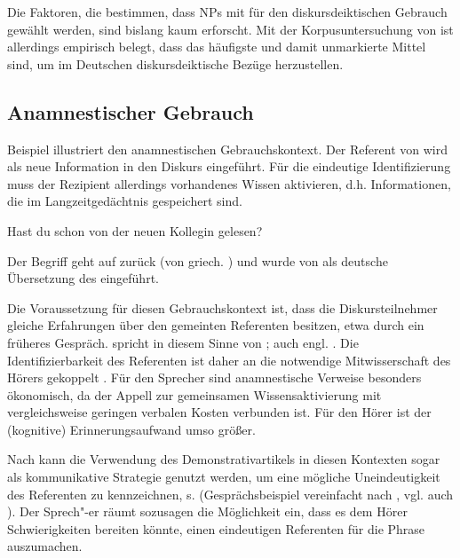 Die Faktoren, die bestimmen, dass NPs  mit  für den diskursdeiktischen  Gebrauch gewählt werden, sind bislang kaum erforscht. Mit der Korpusuntersuchung  von \textcite{Consten2007} ist allerdings empirisch belegt, dass  das häufigste und damit unmarkierte Mittel sind, um im Deutschen diskursdeiktische  Bezüge herzustellen.

\subsection{Anamnestischer Gebrauch}\label{sec:amnamnestisch}

Beispiel  illustriert den anamnestischen  Gebrauchskontext. Der Referent von   wird als neue Information  in den Diskurs eingeführt. Für die eindeutige Identifizierung muss der Rezipient allerdings vorhandenes Wissen aktivieren, d.h. Informationen, die im Langzeitgedächtnis gespeichert sind.

\begin{exe}
	\ex \label{ex:anamn} Hast du schon  von der neuen Kollegin gelesen?  
\end{exe}

Der Begriff   geht auf \textcite{Buhler1934} zurück (von griech.  ) und wurde von \textcite{Himmelmann1997} als deutsche Übersetzung des  \parencite{Himmelmann1996,Diessel1999}  eingeführt.

Die Voraussetzung für diesen Gebrauchskontext ist, dass die Diskursteilnehmer gleiche Erfahrungen über den gemeinten Referenten besitzen, etwa durch ein früheres Gespräch. \textcite[44]{Bisle-Muller1991} spricht in diesem Sinne von ; auch engl.  \parencite[106]{Diessel1999}. Die Identifizierbarkeit des Referenten ist daher an die notwendige Mitwisserschaft des Hörers gekoppelt \parencite[72]{Szczepaniak2011a}. Für den Sprecher sind anamnestische  Verweise besonders ökonomisch, da der Appell zur gemeinsamen Wissensaktivierung mit vergleichsweise geringen verbalen Kosten verbunden ist. Für den Hörer ist der (kognitive) Erinnerungsaufwand umso größer.

Nach \textcite[79--80]{Bisle-Muller1991} kann die Verwendung des Demonstrativartikels  in diesen Kontexten sogar als kommunikative Strategie genutzt werden, um eine mögliche Uneindeutigkeit des Referenten zu kennzeichnen, s.  (Gesprächsbeispiel vereinfacht nach \citealt[637]{Auer1984}, vgl. auch \citealt[58]{Himmelmann1997}). Der Sprech"-er räumt sozusagen die Möglichkeit ein, dass es dem Hörer Schwierigkeiten bereiten könnte, einen eindeutigen Referenten für die Phrase   auszumachen. 

